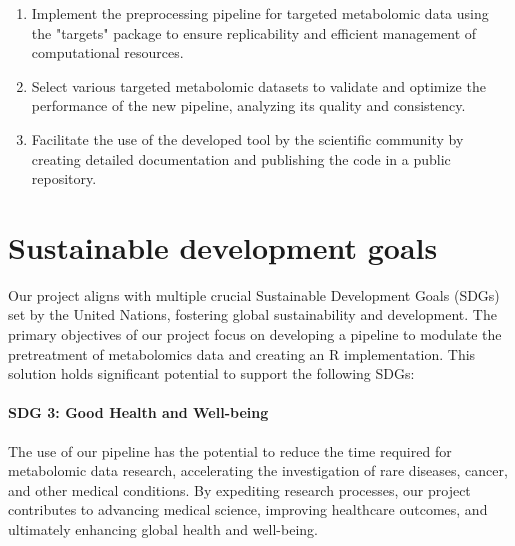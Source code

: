 \documentclass[ENG, BIB]{TFUOC}%
\begin{document}
\begin{enumerate}
\item Implement the preprocessing pipeline for targeted metabolomic data using the "targets" package to ensure replicability and efficient management of computational resources.
\item Select various targeted metabolomic datasets to validate and optimize the performance of the new pipeline, analyzing its quality and consistency.
\item Facilitate the use of the developed tool by the scientific community by creating detailed documentation and publishing the code in a public repository.
\end{enumerate}




\chapter{Sustainable development goals}
\label{s:etic}

 Our project aligns with multiple crucial Sustainable Development Goals (SDGs) set by the United Nations, fostering global sustainability and development. The primary objectives of our project focus on developing a pipeline to modulate the pretreatment of metabolomics data and creating an R implementation. This solution holds significant potential to support the following SDGs:  
 
\subsubsection{SDG 3: Good Health and Well-being} 
 
The use of our pipeline has the potential to reduce the time required for metabolomic data research, accelerating the investigation of rare diseases, cancer, and other medical conditions. By expediting research processes, our project contributes to advancing medical science, improving healthcare outcomes, and ultimately enhancing global health and well-being.
 
\end{document}
